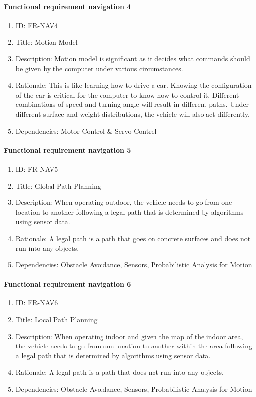 \documentclass[compsoc,draftclsnofoot,onecolumn,10pt]{IEEEtran}
\begin{document}
	\paragraph{Functional requirement navigation 4}
		\begin{enumerate}
			\item ID: FR-NAV4
			\item Title: Motion Model
			\item Description: Motion model is significant as it decides what commands should be given by the computer under various circumstances.
			\item Rationale: This is like learning how to drive a car. Knowing the configuration of the car is critical for the computer to know how to control it. Different combinations of speed and turning angle will result in different paths. Under different surface and weight distributions, the vehicle will also act differently.
			\item Dependencies: Motor Control \& Servo Control
		\end{enumerate} 

	\paragraph{Functional requirement navigation 5}
		\begin{enumerate}
			\item ID: FR-NAV5
			\item Title: Global Path Planning
			\item Description: When operating outdoor, the vehicle needs to go from one location to another following a legal path that is determined by algorithms using sensor data.
			\item Rationale: A legal path is a path that goes on concrete surfaces and does not run into any objects.
			\item Dependencies: Obstacle Avoidance, Sensors, Probabilistic Analysis for Motion
		\end{enumerate}

	\paragraph{Functional requirement navigation 6}
		\begin{enumerate}
			\item ID: FR-NAV6
			\item Title: Local Path Planning
			\item Description: When operating indoor and given the map of the indoor area, the vehicle needs to go from one location to another within the area following a legal path that is determined by algorithms using sensor data.
			\item Rationale: A legal path is a path that does not run into any objects.
			\item Dependencies: Obstacle Avoidance, Sensors, Probabilistic Analysis for Motion
		\end{enumerate}
\end{document}

